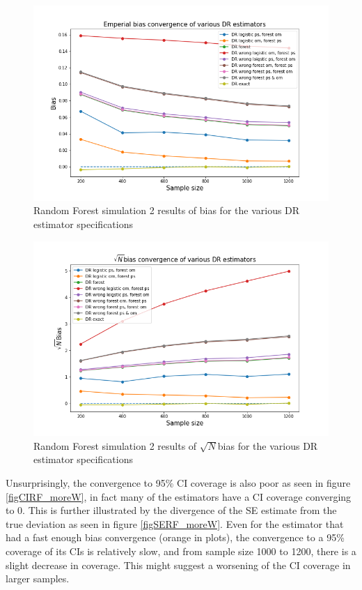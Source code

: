 \documentclass[12pt,twoside]{article}
\begin{document}
\begin{figure}[h!]
    \centering
    \includegraphics[width = 0.9\columnwidth]{figures/biasRF_moreW.png}
    \caption{Random Forest simulation 2 results of bias for the various DR estimator specifications}
    \label{figbiasRF_moreW}
\end{figure}

\begin{figure}[h!]
    \centering
    \includegraphics[width = 0.9\columnwidth]{figures/sqrtnRF_moreW.png}
    \caption{Random Forest simulation 2 results of $\sqrt{N}$bias for the various DR estimator specifications}
    \label{figsqrtnRF_moreW}
\end{figure}

Unsurprisingly, the convergence to 95\% CI coverage is also poor as seen in figure \ref{figCIRF_moreW}, in fact many of the estimators have a CI coverage converging to 0. This is further illustrated by the divergence of the SE estimate from the true deviation as seen in figure \ref{figSERF_moreW}. Even for the estimator that had a fast enough bias convergence (orange in plots), the convergence to a 95\% coverage of its CIs is relatively slow, and from sample size 1000 to 1200, there is a slight decrease in coverage. This might suggest a worsening of the CI coverage in larger samples.
\end{document}
